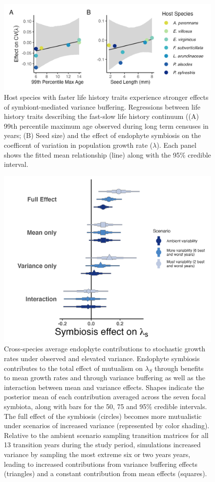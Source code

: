 \documentclass[9pt,twocolumn,twoside]{pnas-new}
\begin{document}
\begin{figure}
	\centering
	\includegraphics[width=.8\linewidth]{StochDemo_fig3.png}
	\caption{Host species with faster life history traits experience stronger effects of symbiont-mediated variance buffering. Regressions between life history traits describing the fast-slow life history continuum ((A) 99th percentile maximum age observed during long term censuses in years; (B) Seed size) and the effect of endophyte symbiosis on the coefficent of variation in population growth rate ($\lambda$). Each panel shows the fitted mean relationship (line) along with the 95\% credible interval.}
\end{figure}

\begin{figure}
	\centering
	\includegraphics[width=.8\linewidth]{StochDemo_fig4.png}
	\caption{Cross-species average endophyte contributions to stochastic growth rates under observed and elevated variance. Endophyte symbiosis contributes to the total effect of mutualism on $\lambda_{S}$ through benefits to mean growth rates and through variance buffering as well as the interaction between mean and variance effects. Shapes indicate the posterior mean of each contribution averaged across the seven focal symbiota, along with bars for the 50, 75 and 95\% credible intervals.  The full effect of the symbiosis (circles) becomes more mutualistic under scenarios of increased variance (represented by color shading). Relative to the ambient scenario sampling transition matrices for all 13 transition years during the study period, simulations increased variance by sampling the most extreme six or two years years, leading to increased contributions from variance buffering effects (triangles) and a constant contribution from mean effects (squares).}
\end{figure}
\end{document}

